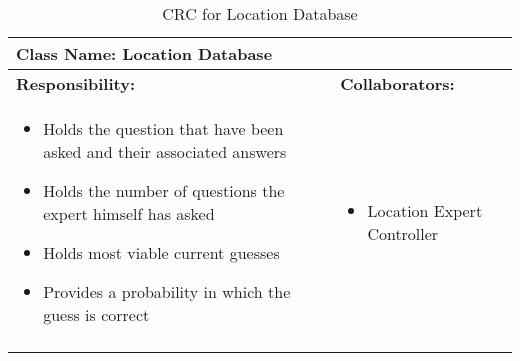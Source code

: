 \documentclass[titlepage]{article}
\begin{document}
	\begin{longtable}{| p{} | p{} |}
			\hline
			 \multicolumn{2}{|l|}{\textbf{Class Name: Location Database}} \\
			\hline
			\textbf{Responsibility:} & \textbf{Collaborators:} \\
			\hline
				\begin{itemize}
					\item Holds the question that have been asked and their associated answers
					\item Holds the number of questions the expert himself has asked
					\item Holds most viable current guesses
					\item Provides a probability in which the guess is correct
				\end{itemize} & 
				\begin{itemize}
					\item Location Expert Controller
				\end{itemize} 
				\\
			\hline
		\caption{CRC for Location Database}
	\end{longtable}
	
	
	
\newpage

\appendix
\end{document}
